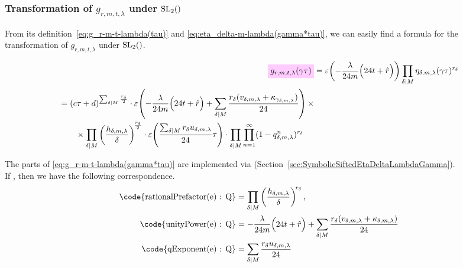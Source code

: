 \documentclass{article}
\begin{document}
\subsubsection{Transformation of $g_{r,m,t,\lambda}$ under $\SL2Z$}

From its definition~\eqref{eq:g_r-m-t-lambda(tau)} and
\eqref{eq:eta_delta-m-lambda(gamma*tau)}, we can easily find a formula
for the transformation of $g_{r,m,t,\lambda}$ under $\SL2Z$.

\begin{align}
  \defineNotation[g-r-m-t-lambda-gamma-tau]{g_{r,m,t,\lambda}(\gamma\tau)}
  &=
    \unityPower{-\frac{\lambda}{24m}\Bigl(24t+\sumdelta{r}\Bigr)}
    \divisorprod{M}
    \eta_{\delta,m,\lambda}(\gamma\tau)^{r_\delta}\notag\\
  \begin{split}
  &=
    (c\tau+d)^{\divisorsum{M} \frac{r_\delta}{2}} \cdot
    \unityPower{-\frac{\lambda}{24m}\Bigl(24t+\sumdelta{r}\Bigr)
    + \divisorsum{M}\frac{r_\delta(v_{\delta,m,\lambda} +
    \kappa_{\gamma_{\delta,m,\lambda}})}{24}} \times\\
  & \qquad\times
    \divisorprod{M}
    \left(\frac{h_{\delta,m,\lambda}}{\delta}\right)^{\!\frac{r_\delta}{2}}
    \cdot
    \unityPower{\frac{\divisorsum{M} r_\delta u_{\delta,m,\lambda}}{24} \tau}
    \cdot
    \divisorprod{M}
    \prod_{n=1}^\infty (1-q_{\delta,m,\lambda}^n)^{r_\delta}
  \end{split}
  \label{eq:g_r-m-t-lambda(gamma*tau)}
\end{align}

The parts of \eqref{eq:g_r-m-t-lambda(gamma*tau)} are implemented via
\textcolor{blue}{}
(Section~\ref{sec:SymbolicSiftedEtaDeltaLambdaGamma}).
\\
If , then we have the
following correspondence.
\begin{align*}
  \text{\code{rationalPrefactor(e) : Q}}
  &=
    \divisorprod{M}
    \left(\frac{h_{\delta,m,\lambda}}{\delta}\right)^{\!r_\delta},
  \\
  \text{\code{unityPower(e) : Q}}
  &=
    -\frac{\lambda}{24m}\Bigl(24t+\sumdelta{r}\Bigr)
    +
    \divisorsum{M} \frac{r_\delta(v_{\delta,m,\lambda} + \kappa_{\delta,m,\lambda})}{24}
  \\
  \text{\code{qExponent(e) : Q}}
  &=
    \divisorsum{M} \frac{r_\delta u_{\delta,m,\lambda}}{24}
\end{align*}
\end{document}

